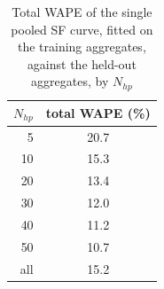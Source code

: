 \begin{table}[t]
\centering
\caption{Total WAPE of the single pooled SF curve, fitted on the training aggregates, against the held-out aggregates, by $N_{hp}$}
\label{tab:sf-train}
\begin{tabular}{rc}
\toprule
$N_{hp}$ & total WAPE (\%) \\
\midrule
5 & 20.7 \\
10 & 15.3 \\
20 & 13.4 \\
30 & 12.0 \\
40 & 11.2 \\
50 & 10.7 \\
\midrule
all & 15.2 \\
\bottomrule
\end{tabular}
\end{table}